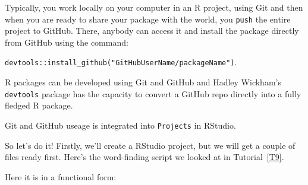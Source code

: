 \documentclass[titlepage]{book}\usepackage{knitr}
\begin{document}
Typically, you work locally on your computer in an R project, using Git and then when you are ready to share your package with the world, you \texttt{push} the entire project to GitHub.  There, anybody can access it and install the package directly from GitHub using the command:

\texttt{devtools::install\_github("GitHubUserName/packageName")}.

R packages can be developed using Git and GitHub and Hadley Wickham's \texttt{devtools} package has the capacity to convert a GitHub repo directly into a fully fledged R package.

Git and GitHub useage is integrated into \texttt{Projects} in RStudio.

So let's do it! Firstly, we'll create a RStudio project, but we will get a couple of files ready first. Here's the word-finding script we looked at in Tutorial~\ref{T9}.


\begin{knitrout}
\color{fgcolor}\begin{kframe}
\begin{alltt}

    \hlkwb{<-} \hlstd{(}\hlstd{,}\hlstd{)}
    \hlkwb{<-} 
   \hlstd{(} \hlstd{)}
    \hlkwb{<-} \hlstd{()}      
      \hlopt{:}
       \hlkwb{<-}   
       \hlkwb{<-} 
   \hlstd{\}}
\end{alltt}
\end{kframe}
\end{knitrout}

Here it is in a functional form:
\end{document}
